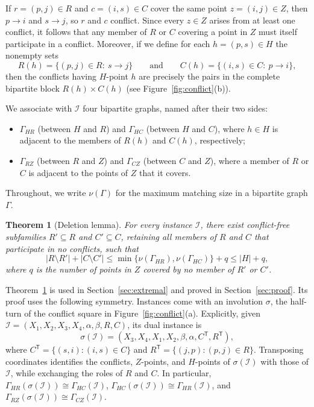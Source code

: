 \documentclass[11pt]{amsart}
\newtheorem{theorem}{Theorem}[section]
\theoremstyle{remark}
\newcommand{\abs}[1]{\lvert #1\rvert}
\newcommand{\T}{\mathsf{T}}
\begin{document}
If $r=(p,j)\in R$ and $c=(i,s)\in C$ cover the same point $z=(i,j)\in Z$, then $p\to i$ and $s\to j$, so $r$ and $c$ conflict. Since every $z\in Z$ arises from at least one conflict, it follows that any member of $R$ or $C$ covering a point in $Z$ must itself participate in a conflict. Moreover, if we define for each $h=(p,s)\in H$ the nonempty sets
\[
  R(h)=\{(p,j)\in R:\ s\to j\}\qquad\text{and}\qquad C(h)=\{(i,s)\in C:\ p\to i\},
\]
then the conflicts having $H$-point $h$ are precisely the pairs in the complete bipartite block $R(h)\times C(h)$ (see Figure~\ref{fig:conflict}(b)).

We associate with $\mathcal I$ four bipartite graphs, named after their two sides:
\begin{itemize}
\item $\Gamma_{HR}$ (between $H$ and $R$) and $\Gamma_{HC}$ (between $H$ and $C$), where $h\in H$ is adjacent to the members of $R(h)$ and $C(h)$, respectively;
\item $\Gamma_{RZ}$ (between $R$ and $Z$) and $\Gamma_{CZ}$ (between $C$ and $Z$), where a member of $R$ or $C$ is adjacent to the points of $Z$ that it covers.
\end{itemize}
Throughout, we write $\nu(\Gamma)$ for the maximum matching size in a bipartite graph $\Gamma$.

\begin{theorem}[Deletion lemma]\label{thm:deletion}
For every instance $\mathcal I$, there exist conflict-free subfamilies $R'\subseteq R$ and $C'\subseteq C$, retaining all members of $R$ and $C$ that participate in no conflicts, such that
\[
  \abs{R\setminus R'}+\abs{C\setminus C'}\le
  \min\{\nu(\Gamma_{HR}),\nu(\Gamma_{HC})\}+q\le\abs H+q,
\]
where $q$ is the number of points in $Z$ covered by no member of $R'$ or $C'$.
\end{theorem}

Theorem~\ref{thm:deletion} is used in Section~\ref{sec:extremal} and proved in Section~\ref{sec:proof}. Its proof uses the following symmetry. Instances come with an involution $\sigma$, the half-turn of the conflict square in Figure~\ref{fig:conflict}(a). Explicitly, given $\mathcal I=(X_1,X_2,X_3,X_4,\alpha,\beta,R,C)$, its dual instance is
\[
  \sigma(\mathcal I)=(X_3,X_4,X_1,X_2,\beta,\alpha,C^\T,R^\T),
\]
where $C^\T=\{(s,i):(i,s)\in C\}$ and $R^\T=\{(j,p):(p,j)\in R\}$.
Transposing coordinates identifies the conflicts, $Z$-points, and $H$-points of $\sigma(\mathcal I)$ with those of $\mathcal I$, while exchanging the roles of $R$ and $C$. In particular, $\Gamma_{HR}(\sigma(\mathcal I))\cong\Gamma_{HC}(\mathcal I)$, $\Gamma_{HC}(\sigma(\mathcal I))\cong\Gamma_{HR}(\mathcal I)$, and $\Gamma_{RZ}(\sigma(\mathcal I))\cong\Gamma_{CZ}(\mathcal I)$.
\end{document}
